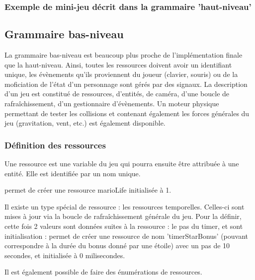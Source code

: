 \subsubsection{Exemple de mini-jeu décrit dans la grammaire 'haut-niveau'}


\subsection{Grammaire bas-niveau}

La grammaire bas-niveau est beaucoup plus proche de l'implémentation finale que la haut-niveau.
Ainsi, toutes les ressources doivent avoir un identifiant unique, les évènements qu'ils proviennent du joueur (clavier, souris) ou de la moficiation
de l'état d'un personnage sont gérés par des signaux.
La description d'un jeu est constitué de ressources, d'entités, de caméra, d'une boucle de rafraîchissement, d'un gestionnaire d'évènements.
Un moteur physique permettant de tester les collisions et contenant également les forces générales du jeu (gravitation, vent, etc.) est également disponible.

\subsubsection{Définition des ressources}

Une ressource est une variable du jeu qui pourra ensuite être attribuée à une entité.
Elle est identifiée par un nom unique.

 permet de créer une ressource marioLife initialisée à 1.

Il existe un type spécial de ressource : les ressources temporelles.
Celles-ci sont mises à jour via la boucle de rafraîchissement générale du jeu.
Pour la définir, cette fois 2 valeurs sont données suites à la ressource : le pas du timer, et sont initialisation :
 permet de créer une ressource de nom 'timerStarBonus' (pouvant correspondre à la durée du bonus donné par une étoile)
avec un pas de 10 secondes, et initialisée à 0 milisecondes. 

Il est également possible de faire des énumérations de ressources.

